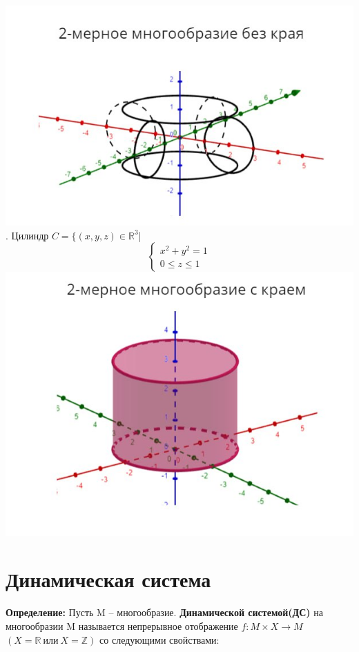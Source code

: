 \documentclass[12pt,a4paper]{article}
\begin{document}
\includegraphics[scale=0.5]{images/Section 2. Manifold/image4}\\

. Цилиндр \(C = \{(x,y,z)\in \mathbb{R}^3\)|
\begin{equation*}
\begin{cases}
x^2+y^2=1
\\
0\leq z\leq1 
\end{cases}
\end{equation*}
\includegraphics[scale=0.5]{images/Section 2. Manifold/image5}
\newpage

\section*{Динамическая система}

\textbf{\large{Определение:}} Пусть M -- многообразие. \textbf{Динамической системой(ДС)} 
на многообразии M называется непрерывное отображение $f:M\times X \rightarrow M~$ $(X = \mathbb{R}~ \textit{или}~ X = \mathbb{Z})$ со следующими свойствами:
\end{document}
